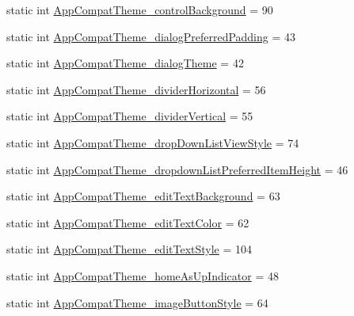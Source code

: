 \begin{DoxyCompactItemize}
static int \hyperlink{classandroid_1_1support_1_1v7_1_1appcompat_1_1R_1_1styleable_adbd4cb3df33f5d9a2b7c946af26dee6c}{App\+Compat\+Theme\+\_\+control\+Background} = 90
\item 
static int \hyperlink{classandroid_1_1support_1_1v7_1_1appcompat_1_1R_1_1styleable_a2ec375fd86ae1937bc7084ae55cb13ac}{App\+Compat\+Theme\+\_\+dialog\+Preferred\+Padding} = 43
\item 
static int \hyperlink{classandroid_1_1support_1_1v7_1_1appcompat_1_1R_1_1styleable_a3b373a5641c2c0d185832eeac15143ef}{App\+Compat\+Theme\+\_\+dialog\+Theme} = 42
\item 
static int \hyperlink{classandroid_1_1support_1_1v7_1_1appcompat_1_1R_1_1styleable_a9f9eeb41cd04fde184cb1d33ff02ac4c}{App\+Compat\+Theme\+\_\+divider\+Horizontal} = 56
\item 
static int \hyperlink{classandroid_1_1support_1_1v7_1_1appcompat_1_1R_1_1styleable_a0229bd53423fdcafebbee737780714c3}{App\+Compat\+Theme\+\_\+divider\+Vertical} = 55
\item 
static int \hyperlink{classandroid_1_1support_1_1v7_1_1appcompat_1_1R_1_1styleable_a3da6d88b52409300bd0e52cd51d23b95}{App\+Compat\+Theme\+\_\+drop\+Down\+List\+View\+Style} = 74
\item 
static int \hyperlink{classandroid_1_1support_1_1v7_1_1appcompat_1_1R_1_1styleable_a64633ebcc361abc4bc0d98ec47d2ec0e}{App\+Compat\+Theme\+\_\+dropdown\+List\+Preferred\+Item\+Height} = 46
\item 
static int \hyperlink{classandroid_1_1support_1_1v7_1_1appcompat_1_1R_1_1styleable_afc8d2168bda3ebfc16b4e27ccdad5f98}{App\+Compat\+Theme\+\_\+edit\+Text\+Background} = 63
\item 
static int \hyperlink{classandroid_1_1support_1_1v7_1_1appcompat_1_1R_1_1styleable_a1e1c82a944abb501f53097bce7f50f0b}{App\+Compat\+Theme\+\_\+edit\+Text\+Color} = 62
\item 
static int \hyperlink{classandroid_1_1support_1_1v7_1_1appcompat_1_1R_1_1styleable_a61b6fb421253f208b594379481457a10}{App\+Compat\+Theme\+\_\+edit\+Text\+Style} = 104
\item 
static int \hyperlink{classandroid_1_1support_1_1v7_1_1appcompat_1_1R_1_1styleable_a64e8a50c8e529ef52de9d6160eec4331}{App\+Compat\+Theme\+\_\+home\+As\+Up\+Indicator} = 48
\item 
static int \hyperlink{classandroid_1_1support_1_1v7_1_1appcompat_1_1R_1_1styleable_a0af1c0cbacd91d7d7139ddfaf38325f6}{App\+Compat\+Theme\+\_\+image\+Button\+Style} = 64
\item 

\end{DoxyCompactItemize}
